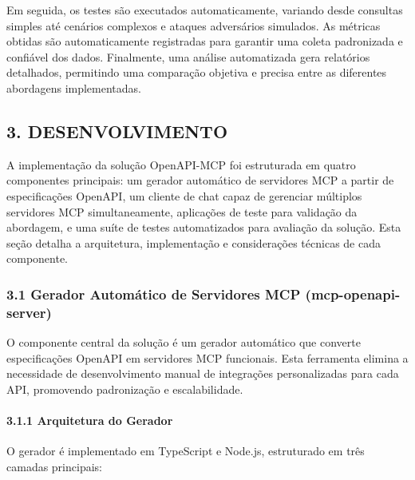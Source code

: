\documentclass[
]{article}
\begin{document}
Em seguida, os testes são executados automaticamente, variando desde
consultas simples até cenários complexos e ataques adversários
simulados. As métricas obtidas são automaticamente registradas para
garantir uma coleta padronizada e confiável dos dados. Finalmente, uma
análise automatizada gera relatórios detalhados, permitindo uma
comparação objetiva e precisa entre as diferentes abordagens
implementadas.

\subsection{3. DESENVOLVIMENTO}\label{desenvolvimento}

A implementação da solução OpenAPI-MCP foi estruturada em quatro
componentes principais: um gerador automático de servidores MCP a partir
de especificações OpenAPI, um cliente de chat capaz de gerenciar
múltiplos servidores MCP simultaneamente, aplicações de teste para
validação da abordagem, e uma suíte de testes automatizados para
avaliação da solução. Esta seção detalha a arquitetura, implementação e
considerações técnicas de cada componente.

\subsubsection{3.1 Gerador Automático de Servidores MCP
(mcp-openapi-server)}\label{gerador-automuxe1tico-de-servidores-mcp-mcp-openapi-server}

O componente central da solução é um gerador automático que converte
especificações OpenAPI em servidores MCP funcionais. Esta ferramenta
elimina a necessidade de desenvolvimento manual de integrações
personalizadas para cada API, promovendo padronização e escalabilidade.

\paragraph{3.1.1 Arquitetura do Gerador}\label{arquitetura-do-gerador}

O gerador é implementado em TypeScript e Node.js, estruturado em três
camadas principais:
\end{document}

